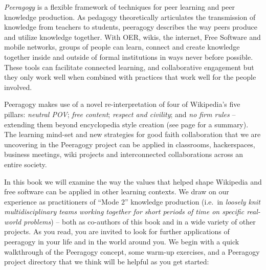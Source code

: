 
\emph{Peeragogy} is a flexible framework of techniques for peer learning and
peer knowledge production.  As pedagogy theoretically articulates the
transmission of knowledge from teachers to students, peeragogy
describes the way peers produce and utilize knowledge together.  With
OER, wikis, the internet, Free Software and mobile networks, groups of
people can learn, connect and create knowledge together inside and
outside of formal institutions in ways never before possible.  These
tools can facilitate connected learning, and collaborative engagement
but they only work well when combined with practices that work well
for the people involved.

Peeragogy makes use of a novel re-interpretation of four of
Wikipedia's five pillars: \emph{neutral POV}; \emph{free
content}; \emph{respect and civility}; and \emph{no firm rules} --
extending them beyond encyclopedia style creation
(see page \pageref{good-faith-collaboration} for a summary).  The learning
mind-set and new strategies for good faith collaboration that we are
uncovering in the Peeragogy project can be applied in classrooms,
hackerspaces, business meetings, wiki projects and interconnected
collaborations across an entire society.

In this book we will examine the way the values that helped shape
Wikipedia and free software can be applied in other learning contexts.
We draw on our experience as practitioners of ``Mode 2'' knowledge
production (i.e.~in \emph{loosely knit multidisciplinary teams working
together for short periods of time on specific real-world problems}) --
both as co-authors of this book and in a wide variety of other
projects.
%
As you read, you are invited to look for further applications of
peeragogy in your life and in the world around you.
%
We begin with a quick walkthrough of the Peeragogy concept, some
warm-up exercises, and a Peeragogy project directory that we think
will be helpful as you get started:

\clearpage


